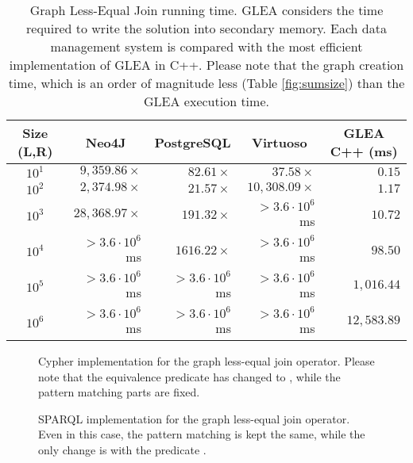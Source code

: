 \begin{table}[!tbp]
	\begin{center}
		\begin{tabular}{crrrr}
			\toprule
			\multicolumn{1}{c}{Size (L,R)}&\multicolumn{1}{c}{Neo4J}&\multicolumn{1}{c}{PostgreSQL}&\multicolumn{1}{c}{Virtuoso}&\multicolumn{1}{c}{\textbf{GLEA C++} (ms)}\\
			\midrule
			$10^1$&$ 9,359.86\times$&$  82.61\times$&$   37.58\times$&$    0.15$\\
			$10^2$&$ 2,374.98\times$&$  21.57\times$&$10,308.09\times$&$    1.17$\\
			$10^3$&$28,368.97\times$&$ 191.32\times$&$>3.6\cdot 10^6$ ms&$   10.72$\\
			$10^4$&$>3.6\cdot 10^6$ ms&$1616.22\times$&$>3.6\cdot 10^6$ ms&$   98.50$\\
			$10^5$&$>3.6\cdot 10^6$ ms&$>3.6\cdot 10^6$ ms&$>3.6\cdot 10^6$ ms&$ 1,016.44$\\
			$10^6$&$>3.6\cdot 10^6$ ms&$>3.6\cdot 10^6$ ms&$>3.6\cdot 10^6$ ms&$12,583.89$\\
			\bottomrule
		\end{tabular}
		\caption{Graph Less-Equal Join running time. GLEA considers the time required to write the solution into secondary memory. Each data management system is compared with the most efficient implementation of GLEA in C++. Please note that the graph creation time, which is an order of magnitude less (Table \ref{fig:sumsize}) than the GLEA execution time.}
		\label{tab:benchLEQ}
	\end{center}
\end{table}


\begin{figure}[!p]
	\begin{minipage}[t]{\textwidth}
		
		\caption{Cypher implementation for the graph less-equal join operator. Please note that the equivalence predicate has changed to \hlcyan{ <= }, while the pattern matching parts are fixed.}
		\label{fig:CypherLEquiJoin}
	\end{minipage}
\end{figure}

\begin{figure}[!p]
	\begin{minipage}[t]{\textwidth}
		
		\caption{SPARQL implementation for the graph less-equal join operator. Even in this case, the pattern matching is kept the same, while the only change is with the predicate \hlcyan{ <= }.}
		\label{fig:SparqlLEquiJoin}
	\end{minipage}
\end{figure}

